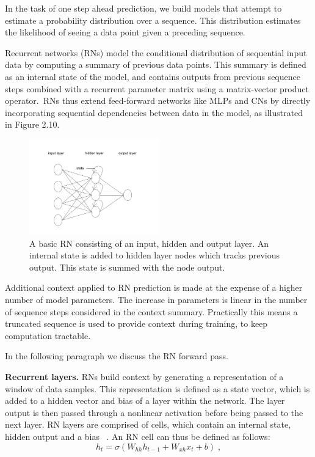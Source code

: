 \noindent In the task of one step ahead prediction, we build models that attempt to estimate a probability distribution over a sequence. This distribution estimates the likelihood of seeing a data point given a preceding sequence. \par 

\noindent Recurrent networks (RNs) model the conditional distribution of sequential input data by computing a summary of previous data points. This summary is defined as an internal state of the model, and contains outputs from previous sequence steps combined with a recurrent parameter matrix using a matrix-vector product operator.\ RNs thus extend feed-forward networks like MLPs and CNs by directly incorporating sequential dependencies between data in the model, as illustrated in Figure 2.10. \par

\begin{figure}[H]
   	\centering
    	\includegraphics[width=0.5\textwidth, height=0.3\textwidth]{recurrent_network}
	\caption{A basic RN consisting of an input, hidden and output layer. An internal state is added to hidden layer nodes which tracks previous output. This state is summed with the node output.}
\end{figure}

\noindent Additional context applied to RN prediction is made at the expense of a higher number of model parameters. The increase in parameters is linear in the number of sequence steps considered in the context summary. Practically this means a truncated sequence is used to provide context during training, to keep computation tractable. \par

\noindent In the following paragraph we discuss the RN forward pass. \par

\noindent \textbf{Recurrent layers.} RNs build context by generating a representation of a window of data samples. This representation is defined as a state vector, which is added to a hidden vector and bias of a layer within the network. The layer output is then passed through a nonlinear activation before being passed to the next layer. RN layers are comprised of cells, which contain an internal state, hidden output and a bias \unskip ~\citep{DLIndaba2018}. An RN cell can thus be defined as follows: 
\begin{equation}
	h_t = \sigma(W_{hh}h_{t-1} + W_{xh}x_t + b) \; ,
\end{equation}

